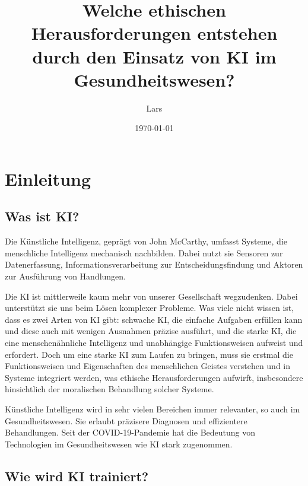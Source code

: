 \documentclass{report}
\title{Welche ethischen Herausforderungen entstehen durch den Einsatz von KI im Gesundheitswesen?}
\author{Lars}
\date{\today}
\begin{document}
\maketitle



    

\tableofcontents


\chapter{Einleitung}

\section{Was ist KI?}
Die Künstliche Intelligenz, geprägt von John McCarthy, umfasst Systeme, die menschliche Intelligenz mechanisch nachbilden. Dabei nutzt sie Sensoren zur Datenerfassung, Informationsverarbeitung zur Entscheidungsfindung und Aktoren zur Ausführung von Handlungen. 

\vspace{2mm}Die KI ist mittlerweile kaum mehr von unserer Gesellschaft wegzudenken. Dabei unterstützt sie uns beim Lösen komplexer Probleme. Was viele nicht wissen ist, dass es zwei Arten von KI gibt: schwache KI, die einfache Aufgaben erfüllen kann und diese auch mit wenigen Ausnahmen präzise ausführt, und die starke KI, die eine menschenähnliche Intelligenz und unabhängige Funktionsweisen aufweist und erfordert. Doch um eine starke KI zum Laufen zu bringen, muss sie erstmal die Funktionsweisen und Eigenschaften des menschlichen Geistes verstehen und in Systeme integriert werden, was ethische Herausforderungen aufwirft, insbesondere hinsichtlich der moralischen Behandlung solcher Systeme.

\vspace{2mm}Künstliche Intelligenz wird in sehr vielen Bereichen immer relevanter, so auch im Gesundheitswesen. Sie erlaubt präzisere Diagnosen und effizientere Behandlungen. Seit der COVID-19-Pandemie hat die Bedeutung von Technologien im Gesundheitswesen wie KI stark zugenommen.
\citep{ostfalia-de}

\vspace{25mm}

\section{Wie wird KI trainiert?}
\end{document}
